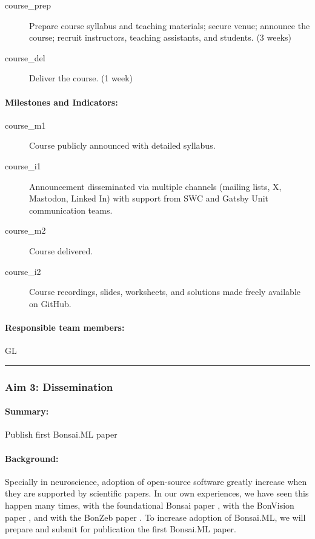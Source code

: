\begin{description}
    \item[course\_prep] Prepare course syllabus and teaching materials; secure venue; announce the course; recruit instructors, teaching assistants, and students. (3 weeks)  
    \item[course\_del] Deliver the course. (1 week)  
\end{description}  

\paragraph{Milestones and Indicators:}  

\begin{description}
    \item[course\_m1] Course publicly announced with detailed syllabus.  
    \item[course\_i1] Announcement disseminated via multiple channels (mailing lists, X, Mastodon, Linked In) with support from SWC and Gatsby Unit communication teams.  
    \item[course\_m2] Course delivered.  
    \item[course\_i2] Course recordings, slides, worksheets, and solutions made freely available on GitHub.  
\end{description}

\paragraph{Responsible team members:} GL

\noindent\rule{\textwidth}{1pt}
\subsubsection{Aim 3: Dissemination}

\paragraph{Summary:} Publish first Bonsai.ML paper

\paragraph{Background:} Specially in neuroscience, adoption of open-source
software greatly increase when they are supported by scientific papers. In our
own experiences, we have seen this happen many times, with the foundational
Bonsai paper \citep{lopesEtAl15}, with the BonVision paper \citep{lopesEtAl21},
and with the BonZeb paper \citep{guilbeaultEtAl21}.
%
To increase adoption of Bonsai.ML, we will prepare and submit for publication
the first Bonsai.ML paper.

